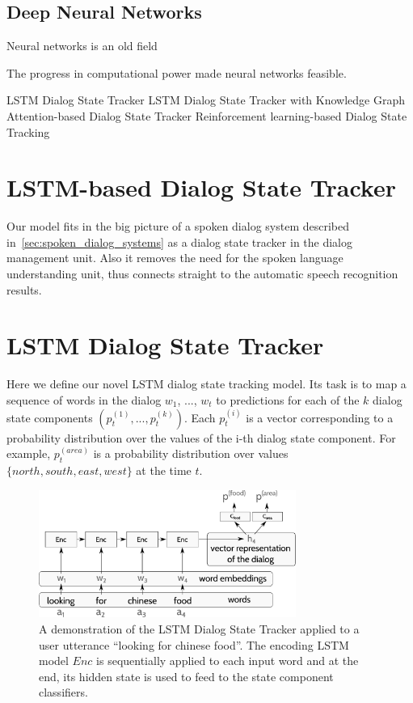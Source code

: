 \documentclass[11pt,twocolumn]{article}
\begin{document}
\subsection{Deep Neural Networks}
Neural networks is an old field

The progress in computational power made neural networks feasible.



LSTM Dialog State Tracker
LSTM Dialog State Tracker with Knowledge Graph
Attention-based Dialog State Tracker
Reinforcement learning-based Dialog State Tracking

\section{LSTM-based Dialog State Tracker}
Our model fits in the big picture of a spoken dialog system described in~\autoref{sec:spoken_dialog_systems} as a dialog state tracker in the dialog management unit. Also it removes the need for the spoken language understanding unit, thus connects straight to the automatic speech recognition results.

\section{LSTM Dialog State Tracker}
\label{sec:lstm_dialog_state_tracker}
Here we define our novel LSTM dialog state tracking model. Its task is to map a sequence of words in the dialog $w_1$, ..., $w_t$ to predictions for each of the $k$ dialog state components $(p^{(1)}_t, ..., p^{(k)}_t)$. Each $p^{(i)}_t$ is a vector corresponding to a probability distribution over the values of the i-th dialog state component. For example, $p^{(area)}_t$ is a probability distribution over values $\{north, south, east, west\}$ at the time $t$.

\begin{figure}
\center
\includegraphics[width=0.75\textwidth]{arch}
\caption{A demonstration of the LSTM Dialog State Tracker applied to a user utterance ``looking for chinese food''. The encoding LSTM model $Enc$ is sequentially applied to each input word and at the end, its hidden state is used to feed to the state component classifiers.}
\label{fig:LecTrack}
\end{figure}
\end{document}
